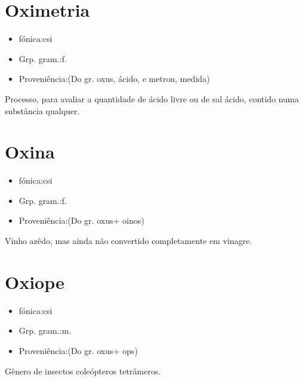 \section{Oximetria}
\begin{itemize}
\item {fónica:csi}
\end{itemize}
\begin{itemize}
\item {Grp. gram.:f.}
\end{itemize}
\begin{itemize}
\item {Proveniência:(Do gr. \textunderscore oxus\textunderscore , ácido, e \textunderscore metron\textunderscore , medida)}
\end{itemize}
Processo, para avaliar a quantidade de ácido livre ou de sal ácido, contido numa substância qualquer.
\section{Oxina}
\begin{itemize}
\item {fónica:csi}
\end{itemize}
\begin{itemize}
\item {Grp. gram.:f.}
\end{itemize}
\begin{itemize}
\item {Proveniência:(Do gr. \textunderscore oxus\textunderscore  + \textunderscore oinos\textunderscore )}
\end{itemize}
Vinho azêdo, mas ainda não convertido completamente em vinagre.
\section{Oxiope}
\begin{itemize}
\item {fónica:csi}
\end{itemize}
\begin{itemize}
\item {Grp. gram.:m.}
\end{itemize}
\begin{itemize}
\item {Proveniência:(Do gr. \textunderscore oxus\textunderscore  + \textunderscore ops\textunderscore )}
\end{itemize}
Gênero de insectos coleópteros tetrâmeros.
